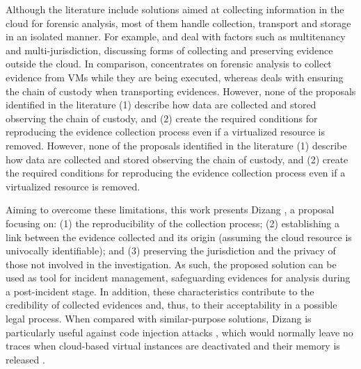 \documentclass[conference]{IEEEtran}
\newcommand{\marcos}[1]{{\color{green}{MARCOS: #1}}}
\newcommand{\fancyname}{Dizang }
\newcommand{\fancynameX}{\fancyname}
\begin{document}
%
Although the literature include solutions aimed at collecting information in the cloud for forensic analysis, most of them handle collection, transport and storage in an isolated manner.
%
For example, \cite{Dykstra_FROST:2013} and \cite{Reichert_Auto_acquisition:2015} deal with factors such as multitenancy and multi-jurisdiction, discussing forms of collecting and preserving evidence outside the cloud.
%
In comparison, \cite{George_DF2CE:2012} concentrates on forensic analysis to collect evidence from VMs while they are being executed, whereas \cite{Sang_Log_approach:2013} deals with ensuring the chain of custody when transporting evidences.
%
However, none of the proposals identified in the literature (1) describe how data are collected and stored observing the chain of custody, and (2) create the required conditions for reproducing the evidence collection process even if a virtualized resource is removed.
However, none of the proposals identified in the literature (1) describe how data are collected and stored observing the chain of custody, and (2) create the required conditions for reproducing the evidence collection process even if a virtualized resource is removed.



%
Aiming to overcome these limitations, this work presents \fancynameX, a proposal focusing on: (1) the reproducibility of the collection process; (2) establishing a link between the evidence collected and its origin (assuming the cloud resource is univocally identifiable); and (3) preserving the jurisdiction and the privacy of those not involved in the investigation.
%
As such, the proposed solution can be used as tool for incident management, safeguarding evidences for analysis during a post-incident stage.
%
In addition, these characteristics contribute to the credibility of collected evidences and, thus, to their acceptability in a possible legal process.
%
%
%
When compared with similar-purpose solutions, \fancyname is particularly useful against code injection attacks \cite{Case_Memory_Forensics:2014}, which would normally leave no traces when cloud-based virtual instances are deactivated and their memory is released \cite{Vomel_Memory_Acquisition:2013,Case_Memory_Forensics:2014}.
\end{document}
